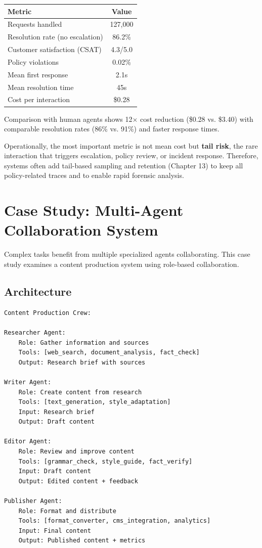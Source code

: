 \begin{center}
\begin{tabular}{lc}
\toprule
Metric & Value \\
\midrule
Requests handled & 127,000 \\
Resolution rate (no escalation) & 86.2\% \\
Customer satisfaction (CSAT) & 4.3/5.0 \\
Policy violations & 0.02\% \\
Mean first response & 2.1s \\
Mean resolution time & 45s \\
Cost per interaction & \$0.28 \\
\bottomrule
\end{tabular}
\end{center}

Comparison with human agents shows 12$\times$ cost reduction (\$0.28 vs. \$3.40) with comparable resolution rates (86\% vs. 91\%) and faster response times.

Operationally, the most important metric is not mean cost but \textbf{tail risk}, the rare interaction that triggers escalation, policy review, or incident response. Therefore, systems often add tail-based sampling and retention (Chapter 13) to keep all policy-related traces and to enable rapid forensic analysis.

\section{Case Study: Multi-Agent Collaboration System}

Complex tasks benefit from multiple specialized agents collaborating. This case study examines a content production system using role-based collaboration.

\subsection{Architecture}

\begin{verbatim}
Content Production Crew:

Researcher Agent:
    Role: Gather information and sources
    Tools: [web_search, document_analysis, fact_check]
    Output: Research brief with sources

Writer Agent:
    Role: Create content from research
    Tools: [text_generation, style_adaptation]
    Input: Research brief
    Output: Draft content

Editor Agent:
    Role: Review and improve content
    Tools: [grammar_check, style_guide, fact_verify]
    Input: Draft content
    Output: Edited content + feedback

Publisher Agent:
    Role: Format and distribute
    Tools: [format_converter, cms_integration, analytics]
    Input: Final content
    Output: Published content + metrics
\end{verbatim}

